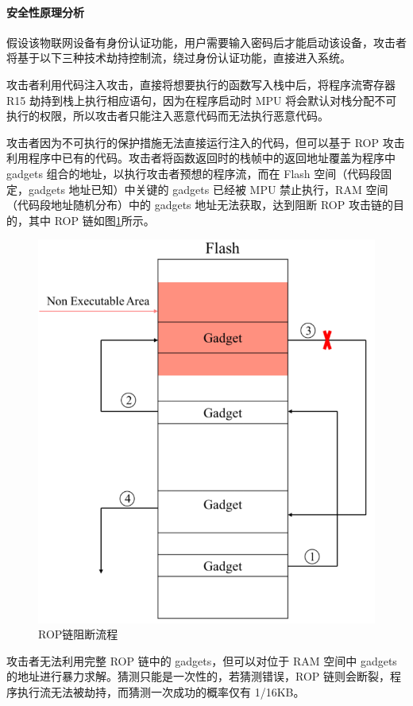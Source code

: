 \documentclass[UTF8,12pt,a4paper]{ctexart}
\numberwithin{figure}{section}
\begin{document}
\paragraph{安全性原理分析}
\par 假设该物联网设备有身份认证功能，用户需要输入密码后才能启动该设备，攻击者将基于以下三种技术劫持控制流，绕过身份认证功能，直接进入系统。
\par 攻击者利用代码注入攻击，直接将想要执行的函数写入栈中后，将程序流寄存器R15 劫持到栈上执行相应语句，因为在程序启动时 MPU 将会默认对栈分配不可执行的权限，所以攻击者只能注入恶意代码而无法执行恶意代码。
\par 攻击者因为不可执行的保护措施无法直接运行注入的代码，但可以基于 ROP 攻击利用程序中已有的代码。攻击者将函数返回时的栈帧中的返回地址覆盖为程序中gadgets 组合的地址，以执行攻击者预想的程序流，而在 Flash 空间（代码段固定，gadgets 地址已知）中关键的 gadgets 已经被 MPU 禁止执行，RAM 空间（代码段地址随机分布）中的 gadgets 地址无法获取，达到阻断 ROP 攻击链的目的，其中 ROP 链如图\ref{ROP blocking process}所示。
\begin{figure}[H]
    \centering
    \includegraphics[scale=0.3]{graph/ROP blocking process.png}
    \caption{ROP链阻断流程}
    \label{ROP blocking process}
\end{figure}
\par 攻击者无法利用完整 ROP 链中的 gadgets，但可以对位于 RAM 空间中 gadgets 的地址进行暴力求解。猜测只能是一次性的，若猜测错误，ROP 链则会断裂，程序执行流无法被劫持，而猜测一次成功的概率仅有 1/16KB。
\end{document}

